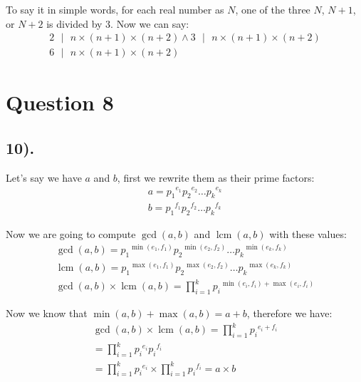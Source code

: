 \documentclass[12pt]{article}
\begin{document}
To say it in simple words, for each real number as $N$, one of the three $N$, $N+1$, or $N+2$ is divided by 3. Now we can say:
\begin{gather*}
    2 \text{ $|$ } n \times (n+1) \times (n+2) \wedge 3 \text{ $|$ } n \times (n+1) \times (n+2) \\
    6 \text{ $|$ } n \times (n+1) \times (n+2)
\end{gather*}

\section*{Question 8}
\subsection*{10).}
Let's say we have $a$ and $b$, first we rewrite them as their prime factors:
\begin{gather*}
    a = {p_{1}}^{e_{1}} {p_{2}}^{e_{2}} \ldots {p_{k}}^{e_{k}} \\
    b = {p_{1}}^{f_{1}} {p_{2}}^{f_{2}} \ldots {p_{k}}^{f_{k}}
\end{gather*}

Now we are going to compute $\gcd(a, b)$ and $\operatorname{lcm}(a, b)$ with these values:
\begin{gather*}
    \gcd(a, b) = {p_{1}}^{\min(e_{1}, f_{1})} {p_{2}}^{\min(e_{2}, f_{2})} \ldots {p_{k}}^{\min(e_{k}, f_{k})} \\
    \operatorname{lcm}(a, b) = {p_{1}}^{\max(e_{1}, f_{1})} {p_{2}}^{\max(e_{2}, f_{2})} \ldots {p_{k}}^{\max(e_{k}, f_{k})} \\
    \gcd(a, b) \times \operatorname{lcm}(a, b) = \prod_{i=1}^{k} {p_{i}}^{\min(e_{i}, f_{i})+\max(e_{i}, f_{i})}
\end{gather*}

Now we know that $\min(a, b) + \max(a, b) = a+b$, therefore we have:
\begin{gather*}
    \gcd(a, b) \times \operatorname{lcm}(a, b) = \prod_{i=1}^{k} {p_{i}}^{e_{i} + f_{i}} \\
    = \prod_{i=1}^{k} {p_{i}}^{e_{i}} {p_{i}}^{f_{i}} \\
    = \prod_{i=1}^{k} {p_{i}}^{e_{i}} \times \prod_{i=1}^{k} {p_{i}}^{f_{i}} = a \times b
\end{gather*}
\end{document}
